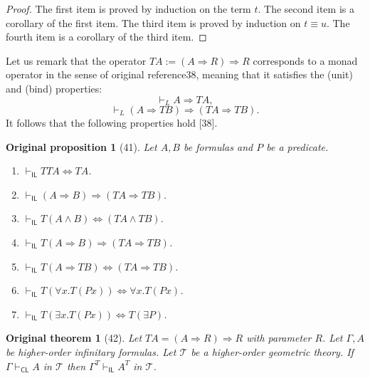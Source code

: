 \documentclass[10pt,a4paper]{article}
\newcommand{\IL}{\mathsf{IL}}
\newcommand{\CL}{\mathsf{CL}}
\newtheorem*{authorprop}{Original proposition}
\newtheorem*{authortheorem}{Original theorem}
\begin{document}
\begin{proof}The first item is proved by induction on the term $t$. The second item is a corollary of the first item. The third item is proved by induction on $t\equiv u$. The fourth item is a corollary of the third item.\end{proof}
Let us remark that the operator $TA:=(A\Rightarrow R)\Rightarrow R$ corresponds to a monad operator in the sense of original reference38, meaning that it satisfies the (unit) and (bind) properties:
\[\vdash_L A\Rightarrow TA,\tag{unit}\]
\[\vdash_L(A\Rightarrow TB)\Rightarrow(TA\Rightarrow TB).\tag{bind}\]
It follows that the following properties hold [38].
\begin{authorprop}[41]
Let $A,B$ be formulas and $P$ be a predicate.
\begin{enumerate}\item $\vdash_\IL TTA\Leftrightarrow TA$.\item $\vdash_\IL(A\Rightarrow B)\Rightarrow(TA\Rightarrow TB)$.\item $\vdash_\IL T(A\wedge B)\Leftrightarrow(TA\wedge TB)$.\item $\vdash_\IL T(A\Rightarrow B)\Rightarrow(TA\Rightarrow TB)$.\item $\vdash_\IL T(A\Rightarrow TB)\Leftrightarrow(TA\Rightarrow TB)$.\item $\vdash_\IL T(\forall x.T(Px))\Leftrightarrow\forall x.T(Px)$.\item $\vdash_\IL T(\exists x.T(Px))\Leftrightarrow T(\exists P)$.\end{enumerate}
\end{authorprop}
\begin{authortheorem}[42]
Let $TA=(A\Rightarrow R)\Rightarrow R$ with parameter $R$. Let $\Gamma,A$ be higher-order infinitary formulas. Let $\mathcal T$ be a higher-order geometric theory. If $\Gamma\vdash_\CL A$ in $\mathcal T$ then $\Gamma^T\vdash_\IL A^T$ in $\mathcal T$.
\end{authortheorem}
\end{document}
